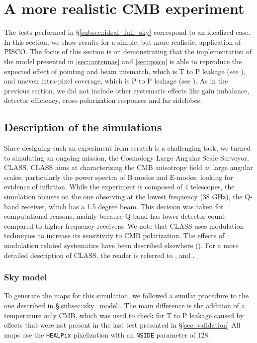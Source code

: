 \documentclass[a4paper,11pt]{article}
\begin{document}
\section{A more realistic CMB experiment}
\label{sec::realistic_cmb_experiment}

The tests performed in \S\ref{subsec::ideal_full_sky} correspond to an idealized case. In this section, we show results for a simple, but more realistic, application of PISCO. The focus of this section is on demonstrating that the implementation of the model presented in \ref{sec::antennas} and \ref{sec::pisco} is able to reproduce the expected effect of pointing and beam mismatch, which is T to P leakage (see \cite{2007MNRAS.376.1767O}), and uneven intra-pixel coverage, which is P to P leakage (see \cite{2005poutanen}). As in the previous section, we did not include other systematic effects like gain imbalance, detector efficiency, cross-polarization responses and far sidelobes.
 
\subsection{Description of the simulations}

Since designing such an experiment from scratch is a challenging task, we turned to simulating an ongoing mission, the Cosmology Large Angular Scale Surveyor, CLASS. CLASS aims at characterizing the CMB anisotropy field at large angular scales, particularly the power spectra of B-modes and E-modes, looking for evidence of inflation. While the experiment is composed of 4 telescopes, the simulation focuses on the one observing at the lowest frequency (38 GHz), the Q-band receiver, which has a 1.5 degree beam. This decision was taken for computational reasons, mainly because Q-band has lower detector count compared to higher frequency receivers. We note that CLASS uses modulation techniques to increase its sensitivity to CMB polarization. The effects of modulation related systematics have been described elsewhere (\cite{2016ApJ...818..151M}). For a more detailed description of CLASS, the reader is referred to \cite{2016SPIE.9914E..1KH}, \cite{2014SPIE.9153E..1IE} and \cite{2019ApJ...876..126A}.

\subsubsection{Sky model}

To generate the maps for this simulation, we followed a similar procedure to the one described in \S\ref{subsec::sky_model}. The main difference is the addition of a temperature only CMB, which was used to check for T to P leakage caused by effects that were not present in the last test presented in \S\ref{sec::validation} All maps use the \texttt{HEALPix} pixelization with an \texttt{NSIDE} parameter of $128$. 
\end{document}
